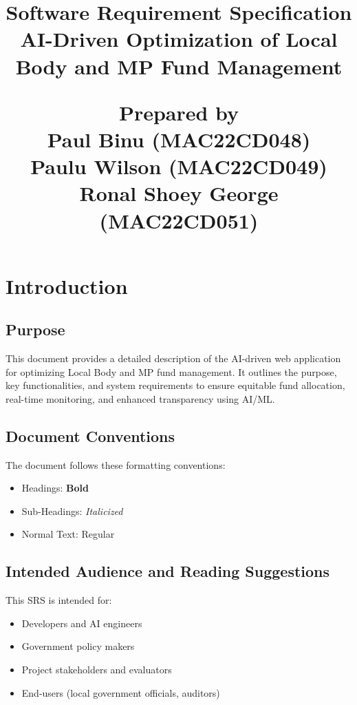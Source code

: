 \documentclass{article}
\title{\textbf{Software Requirement Specification} \\
\textbf{AI-Driven Optimization of Local Body and MP Fund Management} \\
\begin{center}
  \textbf{Prepared by} \\[0.5cm]
Paul Binu  (MAC22CD048)\\
Paulu Wilson (MAC22CD049)\\
Ronal Shoey George (MAC22CD051) 
  
 
\end{center}}
\begin{document}
\maketitle
\newpage

\tableofcontents 
\newpage

\section{Introduction}
\subsection{Purpose}
This document provides a detailed description of the AI-driven web application for optimizing Local Body and MP fund management. It outlines the purpose, key functionalities, and system requirements to ensure equitable fund allocation, real-time monitoring, and enhanced transparency using AI/ML.

\subsection{Document Conventions}
The document follows these formatting conventions:
\begin{itemize}
    \item Headings: \textbf{Bold}
    \item Sub-Headings: \textit{Italicized}
    \item Normal Text: Regular
\end{itemize}

\subsection{Intended Audience and Reading Suggestions}
This SRS is intended for:
\begin{itemize}
    \item Developers and AI engineers
    \item Government policy makers
    \item Project stakeholders and evaluators
    \item End-users (local government officials, auditors)
\end{itemize}
\end{document}
